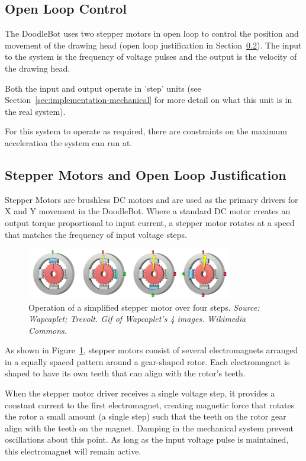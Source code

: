 \subsection{Open Loop Control}
	The DoodleBot uses two stepper motors in open loop to control the position and movement of the drawing head (open loop justification in Section~\ref{sec:control-stepper}). The input to the system is the frequency of voltage pulses and the output is the velocity of the drawing head. 
	
	Both the input and output operate in 'step' units (see Section~\ref*{sec:implementation-mechanical} for more detail on what this unit is in the real system).
	
	For this system to operate as required, there are constraints on the maximum acceleration the system can run at.
	
\subsection{Stepper Motors and Open Loop Justification}
		\label{sec:control-stepper}
			
		Stepper Motors are brushless DC motors and are used as the primary drivers for X and Y movement in the DoodleBot. Where a standard DC motor creates an output torque proportional to input current, a stepper motor rotates at a speed that matches the frequency of input voltage steps.
		
		\begin{figure}[h]
			\centering
			\includegraphics[width=0.8\textwidth]{figures/optimisation/steppermotor}
			\caption[Operation of a simple stepper motor]{Operation of a simplified stepper motor over four steps. \textit{Source: Wapcaplet; Trevolt. Gif of Wapcaplet's 
			4 images. Wikimedia Commons.\cite{website:stepper}}}
			\label{fig:stepper}
		\end{figure}
		
		As shown in Figure~\ref{fig:stepper}, stepper motors consist of several electromagnets arranged in a equally spaced pattern around a gear-shaped rotor. Each electromagnet is shaped to have its own teeth that can align with the rotor's teeth. 
		
		When the stepper motor driver receives a single voltage step, it provides a constant current to the first electromagnet, creating magnetic force that rotates the rotor a small amount (a single step) such that the teeth on the rotor gear align with the teeth on the magnet. Damping in the mechanical system prevent oscillations about this point. As long as the input voltage pulse is maintained, this electromagnet will remain active.
		
